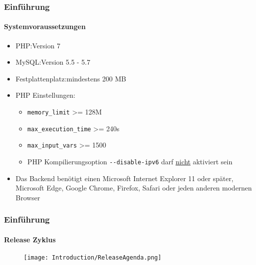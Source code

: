 \begin{frame}[fragile]
	\frametitle{Einführung}
	\framesubtitle{Systemvoraussetzungen}

	\begin{itemize}
		\item PHP:\tabto{3cm}Version 7
		\item MySQL:\tabto{3cm}Version 5.5 - 5.7
		\item Festplattenplatz:\tabto{3cm}mindestens 200 MB
		\item PHP Einstellungen:

			\begin{itemize}
				\item \texttt{memory\_limit} >= 128M
				\item \texttt{max\_execution\_time} >= 240s
				\item \texttt{max\_input\_vars} >= 1500
				\item PHP Kompilierungsoption \texttt{-}\texttt{-disable-ipv6} darf \underline{nicht} aktiviert sein
			\end{itemize}

		\item Das Backend benötigt einen Microsoft Internet Explorer 11 oder später,
			Microsoft Edge, Google Chrome, Firefox, Safari oder jeden anderen modernen Browser

	\end{itemize}

\end{frame}

\begin{frame}[fragile]
	\frametitle{Einführung}
	\framesubtitle{Release Zyklus}

	\begin{figure}
		\texttt{[image: Introduction/ReleaseAgenda.png]}
	\end{figure}

\end{frame}

